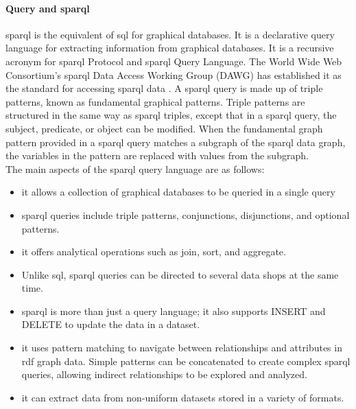             \paragraph{Query and \acrshort{sparql}\label{para:sparql}}
            \acrfull{sparql} is the equivalent of \acrfull{sql} for graphical databases. It is a declarative query language for extracting information from graphical databases. It is a recursive acronym for \acrshort{sparql} Protocol and \acrshort{sparql} Query Language. The World Wide Web Consortium's \acrshort{sparql} Data Access Working Group (DAWG) has established it as the standard for accessing \acrshort{sparql} data \cite{abad2021semankey}. A \acrshort{sparql} query is made up of triple patterns, known as fundamental graphical patterns. Triple patterns are structured in the same way as \acrshort{sparql} triples, except that in a \acrshort{sparql} query, the subject, predicate, or object can be modified. When the fundamental graph pattern provided in a \acrshort{sparql} query matches a subgraph of the \acrshort{sparql} data graph, the variables in the pattern are replaced with values from the subgraph.\\
        
            The main aspects of the \acrshort{sparql} query language are as follows: 
        
            \begin{itemize}
                \item it allows a collection of graphical databases to be queried in a single query 
                \item \acrshort{sparql} queries include triple patterns, conjunctions, disjunctions, and optional patterns. 
                \item it offers analytical operations such as join, sort, and aggregate. 
                \item Unlike \acrshort{sql}, \acrshort{sparql} queries can be directed to several data shops at the same time. 
                \item \acrshort{sparql} is more than just a query language; it also supports INSERT and DELETE to update the data in a dataset.
                \item it uses pattern matching to navigate between relationships and attributes in \acrshort{rdf} graph data. Simple patterns can be concatenated to create complex \acrshort{sparql} queries, allowing indirect relationships to be explored and analyzed. 
                \item it can extract data from non-uniform datasets stored in a variety of formats.
            \end{itemize}


